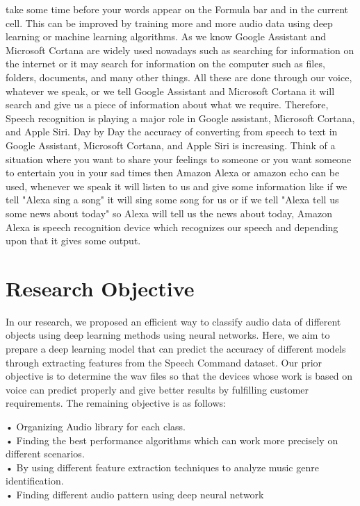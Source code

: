 take some time before your words appear on the Formula bar and in the current cell. This can be improved by training more and more audio data using deep learning or machine learning algorithms. As we know Google Assistant and Microsoft Cortana are widely used nowadays such as searching for information on the internet or it may search for information on the computer such as files, folders, documents, and many other things. All these are done through our voice, whatever we speak, or we tell Google Assistant and Microsoft Cortana it will search and give us a piece of information about what we require. Therefore, Speech recognition is playing a major role in Google assistant, Microsoft Cortana, and Apple Siri. Day by Day the accuracy of converting from speech to text in Google Assistant, Microsoft Cortana, and Apple Siri is increasing. Think of a situation where you want to share your feelings to someone or you want someone to entertain you in your sad times then Amazon Alexa or amazon echo can be used, whenever we speak it will listen to us and give some information like if we tell "Alexa sing a song" it will sing some song for us or if we tell "Alexa tell us some news about today" so Alexa will tell us the news about today, Amazon Alexa is speech recognition device which recognizes our speech and depending upon that it gives some output.
\section{Research Objective }
In our research, we proposed an efficient way to classify audio data of different objects using deep learning methods using neural networks. Here, we aim to prepare a deep learning model that can predict the accuracy of different models through extracting features from the Speech Command dataset. Our prior objective is to determine the wav files so that the devices whose work is based on voice can predict properly and give better results by fulfilling customer requirements. The remaining objective is as follows:
 
•	Organizing Audio library for each class.\\
•	Finding the best performance algorithms which can work more precisely on different scenarios. \\ 
•	By using different feature extraction techniques to analyze music genre identification.\\
•	Finding different audio pattern using deep neural network 

